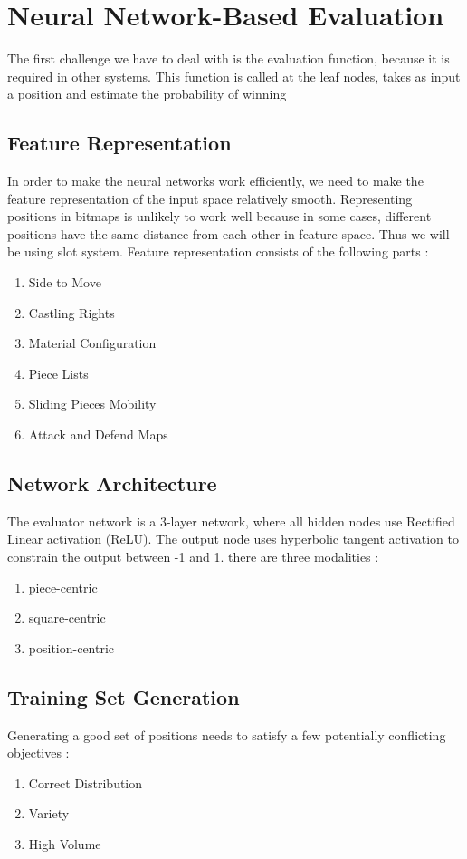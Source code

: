\section{Neural Network-Based Evaluation}
			The first challenge we have to deal with is the evaluation function, because it is required in other systems. This function is called at the leaf nodes, takes as input a position and estimate the probability of winning
		\subsection{Feature Representation}
			In order to make the neural networks work efficiently, we need to make the feature representation of the input space relatively smooth.
			Representing positions in bitmaps is unlikely to work well because in some cases, different positions have the same distance from each other in feature space.
			Thus we will be using slot system.
            Feature representation consists of the following parts :
			\begin{enumerate}
				\item Side to Move
				\item Castling Rights
				\item Material Configuration
				\item Piece Lists
				\item Sliding Pieces Mobility
				\item Attack and Defend Maps
			\end{enumerate}

	
		\subsection{Network Architecture}
			
            The evaluator network is a 3-layer network, where all hidden nodes use Rectified Linear activation (ReLU).
			The output node uses hyperbolic tangent activation to constrain the output between -1 and 1.
			there are three modalities :
			\begin{enumerate}
				\item piece-centric 
				\item square-centric
				\item position-centric
			\end{enumerate}
        
        \subsection{Training Set Generation}
			Generating a good set of positions needs to satisfy a few potentially conflicting objectives : 
			\begin{enumerate}
				\item Correct Distribution
				\item Variety
				\item High Volume
			\end{enumerate}

